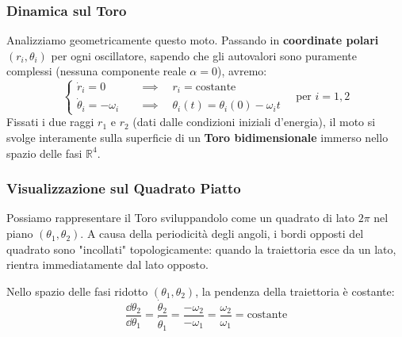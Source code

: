 \documentclass[openany]{book}
\theoremstyle{definition}
\theoremstyle{remark}
\begin{document}
\subsubsection*{Dinamica sul Toro}

Analizziamo geometricamente questo moto. Passando in \textbf{coordinate polari} $(r_i, \theta_i)$ per ogni oscillatore, sapendo che gli autovalori sono puramente complessi (nessuna componente reale $\alpha=0$), avremo:
\begin{equation}
    \begin{cases}
        \dot{r}_i = 0 \quad &\implies \quad r_i = \text{costante} \\
        \dot{\theta}_i = -\omega_i \quad &\implies \quad \theta_i(t) = \theta_i(0) - \omega_i t
    \end{cases}
    \quad \text{per } i=1,2
\end{equation}
Fissati i due raggi $r_1$ e $r_2$ (dati dalle condizioni iniziali d'energia), il moto si svolge interamente sulla superficie di un \textbf{Toro bidimensionale} immerso nello spazio delle fasi $\mathbb{R}^4$.

\subsubsection*{Visualizzazione sul Quadrato Piatto}
Possiamo rappresentare il Toro sviluppandolo come un quadrato di lato $2\pi$ nel piano $(\theta_1, \theta_2)$. A causa della periodicità degli angoli, i bordi opposti del quadrato sono "incollati" topologicamente: quando la traiettoria esce da un lato, rientra immediatamente dal lato opposto.

Nello spazio delle fasi ridotto $(\theta_1, \theta_2)$, la pendenza della traiettoria è costante:
\begin{equation}
    \frac{\dd \theta_2}{\dd \theta_1} = \frac{\dot{\theta}_2}{\dot{\theta}_1} = \frac{-\omega_2}{-\omega_1} = \frac{\omega_2}{\omega_1} = \text{costante}
\end{equation}
\end{document}
